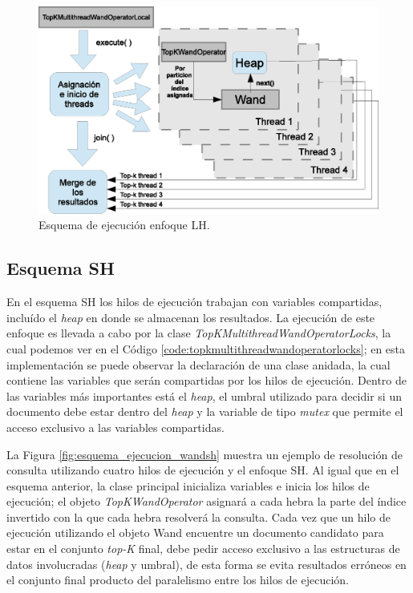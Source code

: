 \begin{figure}[th!]
\centering
\includegraphics[scale=.75]{images/ejecucion_topkmultithreadwandopLOCAL.eps}
\caption{Esquema de ejecución enfoque LH.}
\label{fig:esquema_ejecucion_wandlh}
\end{figure}

\subsection{Esquema SH}
\label{evaluacionexperimental:esquemash}
En el esquema SH los hilos de ejecución trabajan con variables compartidas, incluído el \textit{heap} en donde se almacenan los resultados. La ejecución de este enfoque es llevada a cabo por la clase \textit{TopKMultithreadWandOperatorLocks}, la cual podemos ver en el Código \ref{code:topkmultithreadwandoperatorlocks}; en esta implementación se puede observar la declaración de una clase anidada, la cual contiene las variables que serán compartidas por los hilos de ejecución. Dentro de las variables más importantes está el \textit{heap}, el umbral utilizado para decidir si un documento debe estar dentro del \textit{heap} y la variable de tipo \textit{mutex} que permite el acceso exclusivo a las variables compartidas. 



La Figura \ref{fig:esquema_ejecucion_wandsh} muestra un ejemplo de resolución de consulta utilizando cuatro hilos de ejecución y el enfoque SH. Al igual que en el esquema anterior, la clase principal inicializa variables e inicia los hilos de ejecución; el objeto \textit{TopKWandOperator} asignará a cada hebra la parte del índice invertido con la que cada hebra resolverá la consulta. Cada vez que un hilo de ejecución utilizando el objeto Wand encuentre un documento candidato para estar en el conjunto \textit{top-K} final, debe pedir acceso exclusivo a las estructuras de datos involucradas (\textit{heap} y umbral), de esta forma se evita resultados erróneos en el conjunto final producto del paralelismo entre los hilos de ejecución.  

